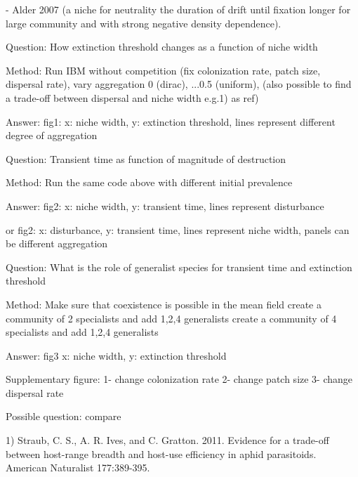 
- Alder 2007 (a niche for neutrality the duration of drift until fixation  longer	 for large community and with strong negative density dependence). 

Question:
How extinction threshold changes as a function of niche width

Method:
Run IBM without competition (fix colonization rate, patch size, dispersal rate), vary aggregation 0 (dirac), ...0.5 (uniform), (also possible to find a trade-off between dispersal and niche width e.g.1) as ref)

Answer:
fig1: x: niche width, y: extinction threshold, lines represent different degree of aggregation

Question:
Transient time as function of  magnitude of destruction

Method:
Run the same code above with different initial prevalence

Answer:
fig2: x: niche width, y: transient time, lines represent disturbance

or 
fig2: x: disturbance, y: transient time, lines represent niche width, panels can be different aggregation

Question:
What is the role of generalist species for transient time and extinction threshold

Method:
Make sure that coexistence is possible in the mean field
create a community of 2 specialists and add  1,2,4 generalists
create a community of 4 specialists and add 1,2,4 generalists

Answer:
fig3 x: niche width, y: extinction threshold 
  
  
Supplementary figure:
1- change colonization rate
2- change patch size
3- change dispersal rate  
  
Possible question: compare   

1) Straub, C. S., A. R. Ives, and C. Gratton. 2011. Evidence for a trade-off between host-range breadth and host-use efficiency in aphid parasitoids. American Naturalist 177:389-395.
